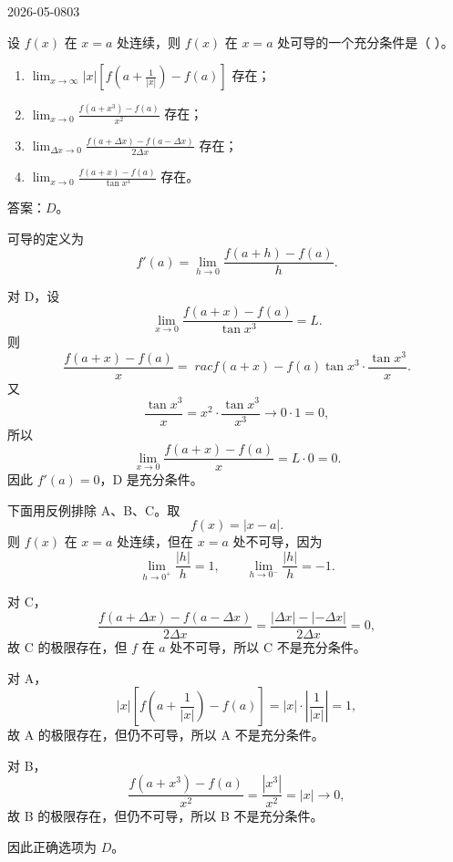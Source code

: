\begin{mistake}{2026-05-08}{03}

\begin{problemcontent}
设 \(f(x)\) 在 \(x=a\) 处连续，则 \(f(x)\) 在 \(x=a\) 处可导的一个充分条件是（ ）。

\begin{enumerate}
  \item[A.] \(\displaystyle \lim_{x\to\infty}|x|\left[f\left(a+\frac{1}{|x|}\right)-f(a)\right]\) 存在；
  \item[B.] \(\displaystyle \lim_{x\to0}\frac{f(a+x^3)-f(a)}{x^2}\) 存在；
  \item[C.] \(\displaystyle \lim_{\Delta x\to0}\frac{f(a+\Delta x)-f(a-\Delta x)}{2\Delta x}\) 存在；
  \item[D.] \(\displaystyle \lim_{x\to0}\frac{f(a+x)-f(a)}{\tan x^3}\) 存在。
\end{enumerate}
\end{problemcontent}

\begin{solutioncontent}
答案：\(\boxed{D}\)。

可导的定义为
\[
f'(a)=\lim_{h\to0}\frac{f(a+h)-f(a)}{h}.
\]

对 D，设
\[
\lim_{x\to0}\frac{f(a+x)-f(a)}{\tan x^3}=L.
\]
则
\[
\frac{f(a+x)-f(a)}{x}
=￿rac{f(a+x)-f(a)}{\tan x^3}\cdot \frac{\tan x^3}{x}.
\]
又
\[
\frac{\tan x^3}{x}=x^2\cdot \frac{\tan x^3}{x^3}\to 0\cdot 1=0,
\]
所以
\[
\lim_{x\to0}\frac{f(a+x)-f(a)}{x}=L\cdot0=0.
\]
因此 \(f'(a)=0\)，D 是充分条件。

下面用反例排除 A、B、C。取
\[
f(x)=|x-a|.
\]
则 \(f(x)\) 在 \(x=a\) 处连续，但在 \(x=a\) 处不可导，因为
\[
\lim_{h\to0^+}\frac{|h|}{h}=1,
\qquad
\lim_{h\to0^-}\frac{|h|}{h}=-1.
\]

对 C，
\[
\frac{f(a+\Delta x)-f(a-\Delta x)}{2\Delta x}
=\frac{|\Delta x|-|-\Delta x|}{2\Delta x}=0,
\]
故 C 的极限存在，但 \(f\) 在 \(a\) 处不可导，所以 C 不是充分条件。

对 A，
\[
|x|\left[f\left(a+\frac1{|x|}\right)-f(a)\right]
=|x|\cdot \left|\frac1{|x|}\right|=1,
\]
故 A 的极限存在，但仍不可导，所以 A 不是充分条件。

对 B，
\[
\frac{f(a+x^3)-f(a)}{x^2}
=\frac{|x^3|}{x^2}=|x|\to0,
\]
故 B 的极限存在，但仍不可导，所以 B 不是充分条件。

因此正确选项为 \(\boxed{D}\)。
\end{solutioncontent}


\end{mistake}
